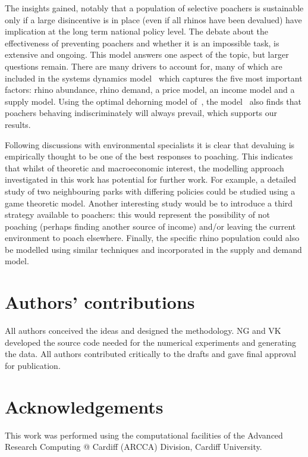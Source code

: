 \documentclass[10pt]{article}
\begin{document}
The insights gained, notably that a population of selective poachers is
sustainable only if a large disincentive is in place (even if all rhinos have
been devalued) have implication at the long term national policy level.
The debate about the effectiveness of preventing poachers and whether it is an
impossible task, is extensive and ongoing. This model answers one aspect of the
topic, but larger questions remain. There are many drivers to account for, many
of which are included in the systems dynamics model~\cite{crookes2016trading}
which captures the five most important factors: rhino abundance, rhino demand,
a price model, an income model and a supply model. Using the optimal dehorning
model of~\cite{Milner1992}, the model~\cite{crookes2016trading} also finds that
poachers behaving indiscriminately will always prevail, which supports our results.

Following discussions with environmental specialists it is clear that devaluing
is empirically thought to be one of the best responses to poaching. This
indicates that whilst of theoretic and macroeconomic interest, the modelling
approach investigated in this work has potential for further work. For example,
a detailed study of two neighbouring parks with differing policies could be
studied using a game theoretic model. Another interesting study would be to
introduce a third strategy available to poachers: this would represent the
possibility of not poaching (perhaps finding another source of income) and/or
leaving the current environment to poach elsewhere. Finally, the specific rhino
population could also be modelled using similar techniques and incorporated in
the supply and demand model.

\section*{Authors' contributions}

All authors conceived the ideas and designed the methodology. NG and VK developed the
source code needed for the numerical experiments and generating the data. All authors
contributed critically to the drafts and gave final approval for publication.

\section*{Acknowledgements}

This work was performed using the computational facilities of the Advanced
Research Computing @ Cardiff (ARCCA) Division, Cardiff University.
\end{document}
